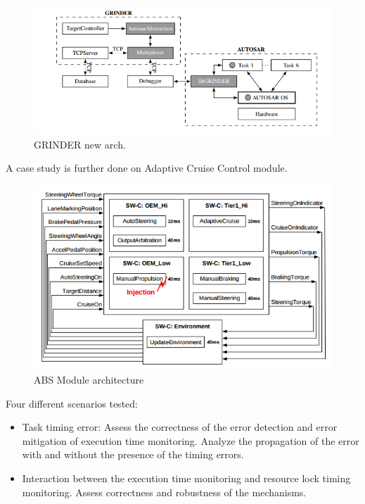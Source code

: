 \documentclass[12pt]{article} %
\begin{document}
\begin{figure}[H]
	\centering
	\includegraphics[width=400pt]{Pictures/GRINDER_Arch}
	\caption{GRINDER new arch.}\label{visina8}
\end{figure}

A case study is further done on Adaptive Cruise Control module. 
\begin{figure}[H]
	\centering
	\includegraphics[width=400pt]{Pictures/ABS}
	\caption{ABS Module architecture}\label{abs}
\end{figure}


Four different scenarios tested:
\begin{itemize}
	\item Task timing error: Assess the correctness of the error detection and error mitigation of execution time monitoring. Analyze the propagation of the error with and without the presence of the timing errors.
	\item Interaction between the execution time monitoring and resource lock timing monitoring. Assess correctness and robustness of the mechanisms.
\end{itemize}
\end{document}
